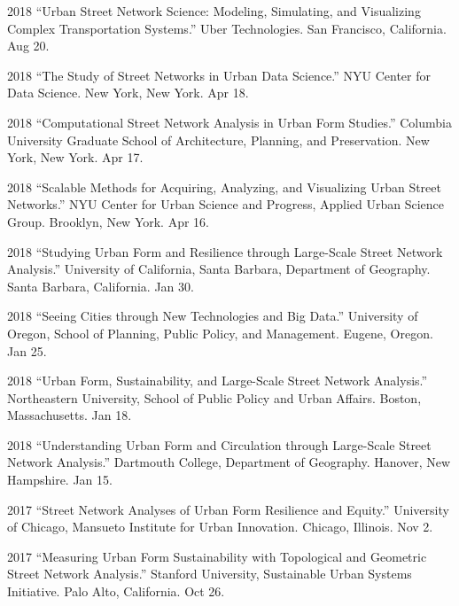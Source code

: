 \documentclass[12pt,letterpaper]{report}
\begin{document}
\begin{tablist}
        \item[2018] \tab \enquote{Urban Street Network Science: Modeling, Simulating, and Visualizing Complex Transportation Systems.} Uber Technologies. San Francisco, California. Aug 20.

        \item[2018] \tab \enquote{The Study of Street Networks in Urban Data Science.} NYU Center for Data Science. New York, New York. Apr 18.

        \item[2018] \tab \enquote{Computational Street Network Analysis in Urban Form Studies.} Columbia University Graduate School of Architecture, Planning, and Preservation. New York, New York. Apr 17.

        \item[2018] \tab \enquote{Scalable Methods for Acquiring, Analyzing, and Visualizing Urban Street Networks.} NYU Center for Urban Science and Progress, Applied Urban Science Group. Brooklyn, New York. Apr 16.

        \item[2018] \tab \enquote{Studying Urban Form and Resilience through Large-Scale Street Network Analysis.} University of California, Santa Barbara, Department of Geography. Santa Barbara, California. Jan 30.

        \item[2018] \tab \enquote{Seeing Cities through New Technologies and Big Data.} University of Oregon, School of Planning, Public Policy, and Management. Eugene, Oregon. Jan 25.

        \item[2018] \tab \enquote{Urban Form, Sustainability, and Large-Scale Street Network Analysis.} Northeastern University, School of Public Policy and Urban Affairs. Boston, Massachusetts. Jan 18.

        \item[2018] \tab \enquote{Understanding Urban Form and Circulation through Large-Scale Street Network Analysis.} Dartmouth College, Department of Geography. Hanover, New Hampshire. Jan 15.

        \item[2017] \tab \enquote{Street Network Analyses of Urban Form Resilience and Equity.} University of Chicago, Mansueto Institute for Urban Innovation. Chicago, Illinois. Nov 2.

        \item[2017] \tab \enquote{Measuring Urban Form Sustainability with Topological and Geometric Street Network Analysis.} Stanford University, Sustainable Urban Systems Initiative. Palo Alto, California. Oct 26.


\end{tablist}
\end{document}
